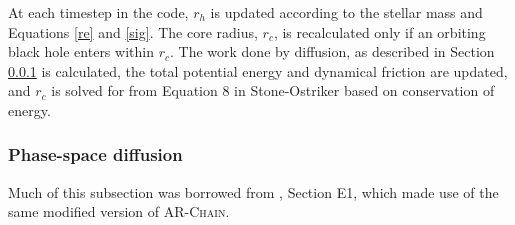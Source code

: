 \documentclass[fleqn,usenatbib,useAMS]{mnras}
\begin{document}
At each timestep in the code, $r_h$ is updated according to the stellar mass and Equations \ref{re} and \ref{sig}.  The core radius, $r_c$, is recalculated only if an orbiting black hole enters within $r_c$.  The work done by diffusion, as described in Section \ref{psd} is calculated, the total potential energy and dynamical friction are updated, and $r_c$ is solved for from Equation 8 in Stone-Ostriker based on conservation of energy.

\subsubsection{Phase-space diffusion} \label{psd}
Much of this subsection was borrowed from \citet{2017MNRAS.467.4180S}, Section E1, which made use of the same modified version of \textsc{AR-Chain}.
\end{document}
